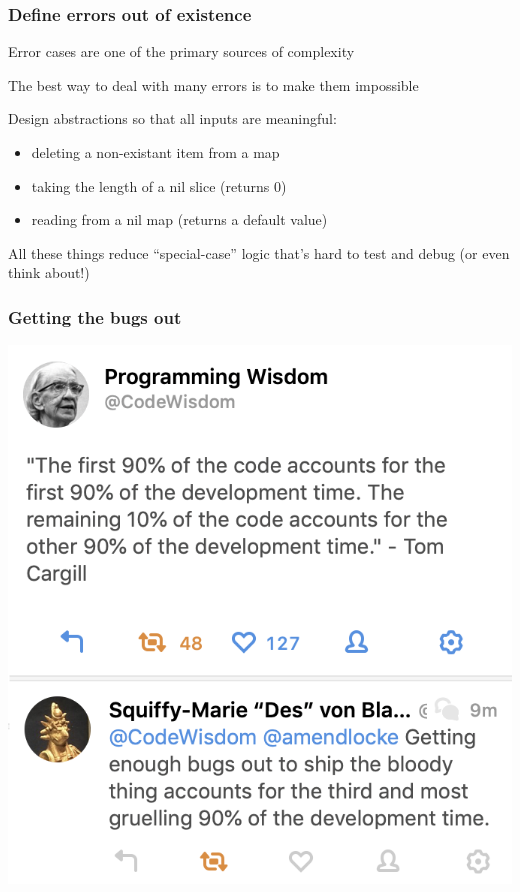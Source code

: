 \documentclass[handout,compress,t,11pt]{beamer}
\begin{document}
\begin{frame}[fragile]
    \frametitle{Define errors out of existence}
    Error cases are one of the primary sources of complexity \par
    \vspace{0.4\baselineskip}
    The best way to deal with many errors is to make them impossible \par
    \vspace{0.4\baselineskip}
    Design abstractions so that all inputs are meaningful:
    \begin{itemize}
        \item deleting a non-existant item from a map
        \item taking the length of a nil slice (returns 0)
        \item reading from a nil map (returns a default value)
    \end{itemize}
    \vspace{\baselineskip}
    All these things reduce ``special-case'' logic that's hard to test and debug
    (or even think about!) \par
\end{frame}


\begin{frame}[fragile]
    \frametitle{Getting the bugs out}
    \begin{center}
    \includegraphics[height=.85\textheight]{bugs-out.png}
    \end{center}
\end{frame}
\end{document}
